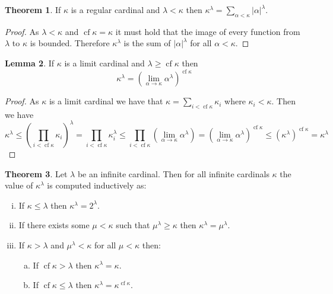 \documentclass{article}
\theoremstyle{definition}
\newtheorem{thm}{Theorem}[section]
\newtheorem{lmma}[thm]{Lemma}
\DeclareMathOperator{\cf}{cf}
\newcommand{\abs}[1]{\lvert#1\rvert}
\begin{document}
\begin{thm}
    If $\kappa$ is a regular cardinal and $\lambda < \kappa$ then $\kappa^\lambda = \sum_{\alpha < \kappa} \abs{\alpha}^\lambda$. 
\end{thm}

\begin{proof}
    As $\lambda < \kappa$ and $\cf \kappa = \kappa$ it must hold that the image of every function from $\lambda$ to $\kappa$ is bounded. Therefore $\kappa^\lambda$ is the sum of $\abs{\alpha}^\lambda$ for all $\alpha < \kappa$.
\end{proof}

\begin{lmma}
    If $\kappa$ is a limit cardinal and $\lambda \ge \cf \kappa$ then 
    \[
        \kappa^\lambda = (\lim_{\alpha \to \kappa} \alpha^\lambda)^{\cf \kappa}
    \]
\end{lmma}

\begin{proof}
    As $\kappa$ is a limit cardinal we have that $\kappa = \sum_{i < \cf \kappa} \kappa_i$ where $\kappa_i < \kappa$. Then we have 
    \[
        \kappa^\lambda \le (\prod_{i < \cf \kappa} \kappa_i)^\lambda = \prod_{i < \cf \kappa} \kappa_{i}^\lambda \le \prod_{i < \cf \kappa} (\lim_{\alpha \to \kappa} \alpha^\lambda) = (\lim_{\alpha \to \kappa} \alpha^\lambda)^{\cf \kappa} \le (\kappa^\lambda)^{\cf \kappa} = \kappa^\lambda
    \]
\end{proof}

\begin{thm}
    Let $\lambda$ be an infinite cardinal. Then for all infinite cardinals $\kappa$ the value of $\kappa^\lambda$ is computed inductively as:
    \begin{enumerate}[(i)]
        \item If $\kappa \le \lambda$ then $\kappa^\lambda = 2^\lambda$.
        \item If there exists some $\mu < \kappa$ such that $\mu^\lambda \ge \kappa$ then $\kappa^\lambda = \mu^\lambda$. 
        \item If $\kappa > \lambda$ and $\mu^\lambda < \kappa$ for all $\mu < \kappa$ then:
        \begin{enumerate}[(a)]
            \item If $\cf \kappa > \lambda$ then $\kappa^\lambda = \kappa$.
            \item If $\cf \kappa \le \lambda$ then $\kappa^\lambda = \kappa^{\cf \kappa}$.
        \end{enumerate}
    \end{enumerate}
\end{thm}
\end{document}
